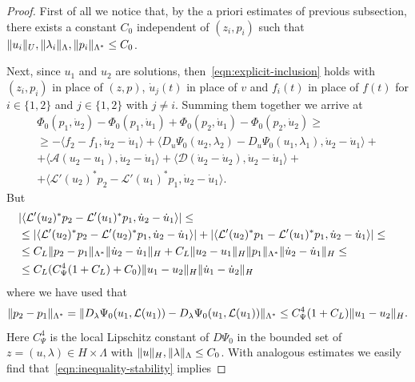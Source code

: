 \documentclass[a4paper,10pt,twoside]{amsbook}
\numberwithin{section}{chapter}
\numberwithin{equation}{chapter}
\theoremstyle{definition}
\DeclarePairedDelimiter{\norm}{\lVert}{\rVert}
\begin{document}
\begin{proof}
First of all we notice that, by the a priori estimates of previous subsection, there exists a constant $C_0$ independent of $(z_i,p_i)$ such that $\norm{u_i}_U,\norm{\lambda_i}_\Lambda,\norm{p_i}_{\Lambda^*}\le C_0$.

Next, since $u_1$ and $u_2$ are solutions, then~\eqref{eqn:explicit-inclusion} holds with $(z_i,p_i)$ in place of $(z,p)$, $\dot u_j(t)$ in place of $v$ and $f_i(t)$ in place of $f(t)$ for $i\in\{1,2\}$ and $j\in\{1,2\}$ with $j\neq i$. Summing them together we arrive at
\begin{equation}
\label{eqn:inequality-stability}
\begin{multlined}
\Phi_0(p_1,\dot{u}_2)-\Phi_0(p_1,\dot{u}_1)+\Phi_0(p_2,\dot{u}_1)-\Phi_0(p_2,\dot{u}_2)\ge\\
\ge-\langle f_2-f_1,\dot{u}_2-\dot{u}_1\rangle+\langle D_u\Psi_0({u}_2,\lambda_2)-D_u\Psi_0({u}_1,\lambda_1),\dot{u}_2-\dot{u}_1\rangle+\\
+\langle \mathcal A(u_2-u_1),\dot{u}_2-\dot{u}_1\rangle+\langle \mathcal D(\dot{u}_2-\dot{u}_2),\dot{u}_2-\dot{u}_1\rangle+\\
+\langle\mathcal{L}'(u_2)^*p_2-\mathcal{L}'(u_1)^*p_1,\dot{u}_2-\dot{u}_1\rangle.
\end{multlined}
\end{equation}
But
\[
\begin{multlined}
|\langle\mathcal{L}'(u_2)^*p_2-\mathcal{L}'(u_1)^*p_1,\dot{u}_2-\dot{u}_1\rangle|\le\\
\begin{split}
&\le|\langle\mathcal{L}'(u_2)^*p_2-\mathcal{L}'(u_2)^*p_1,\dot{u}_2-\dot{u}_1\rangle|+|\langle\mathcal{L}'(u_2)^*p_1-\mathcal{L}'(u_1)^*p_1,\dot{u}_2-\dot{u}_1\rangle|\le\\
&\le C_L\norm{p_2-p_1}_{\Lambda^*}\norm{\dot u_2-\dot u_1}_H+C_L\norm{u_2-u_1}_H\norm{p_1}_{\Lambda^*}\norm{\dot u_2-\dot u_1}_H\le\\
&\le C_L(C_\Psi^4(1+C_L)+C_0)\norm{u_1-u_2}_H\norm{\dot u_1-\dot u_2}_H
\end{split}
\end{multlined}
\]
where we have used that
\[
\norm{p_2-p_1}_{\Lambda^*}=\norm{D_\lambda\Psi_0(u_1,\mathcal{L}(u_1))-D_\lambda\Psi_0(u_1,\mathcal{L}(u_1))}_{\Lambda^*}\le C_\Psi^4(1+C_L)\norm{u_1-u_2}_H.
\]
Here $C_\Psi^4$ is the local Lipschitz constant of $D\Psi_0$ in the bounded set of $z=(u,\lambda)\in H\times\Lambda$ with $\norm{u}_H,\norm{\lambda}_\Lambda\le C_0$. With analogous estimates we easily find that~\eqref{eqn:inequality-stability} implies

\end{proof}
\end{document}

